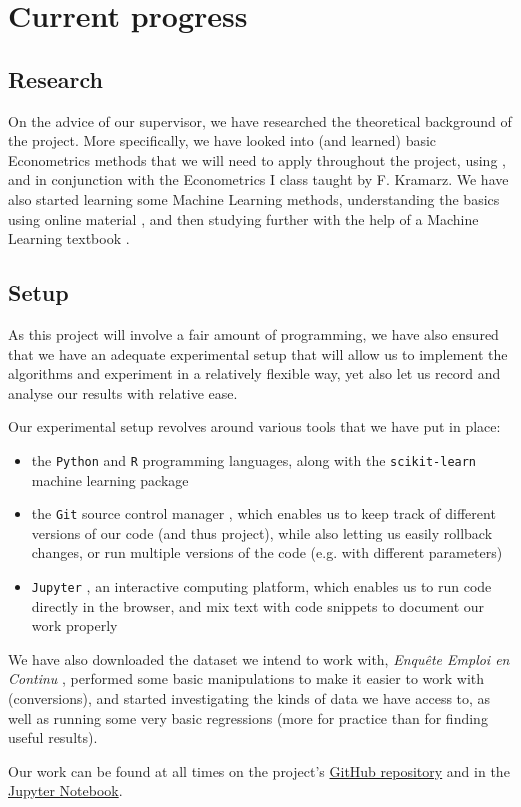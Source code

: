 \section{Current progress} \subsection{Research} On the advice of our supervisor, we have researched
the theoretical background of the project. More specifically, we have looked into (and learned)
basic Econometrics methods that we will need to apply throughout the project, using
\cite{wooldridge}, and in conjunction with the Econometrics I class taught by F. Kramarz. We have
also started learning some Machine Learning methods, understanding the basics using online material
\cite{vidhya}, and then studying further with the help of a Machine Learning textbook \cite{introR}.

\subsection{Setup} As this project will involve a fair amount of programming, we have also ensured
that we have an adequate experimental setup that will allow us to implement the algorithms and
experiment in a relatively flexible way, yet also let us record and analyse our results with
relative ease.

Our experimental setup revolves around various tools that we have put in place:
\begin{itemize}
    \item the \texttt{Python} and \texttt{R} programming languages, along with the
\texttt{scikit-learn} machine learning package \cite{python}\cite{R}\cite{learn}
    \item the \texttt{Git} source control manager \cite{git}, which enables us to keep track of
different versions of our code (and thus project), while also letting us easily rollback changes,
or run multiple versions of the code (e.g. with different parameters)
    \item \texttt{Jupyter} \cite{jupyter}, an interactive computing platform, which enables us to
run code directly in the browser, and mix text with code snippets to document our work properly
\end{itemize}

We have also downloaded the dataset we intend to work with, \emph{Enqu\^ete Emploi en Continu}
\cite{enquete}, performed some basic manipulations to make it easier to work with (conversions), and
started investigating the kinds of data we have access to, as well as running some very basic
regressions (more for practice than for finding useful results).

Our work can be found at all times on the project's
\href{https://github.com/ncocacola/econml/}{GitHub repository} and in the
\href{https://github.com/ncocacola/econml/blob/master/econml.ipynb}{Jupyter Notebook}.
